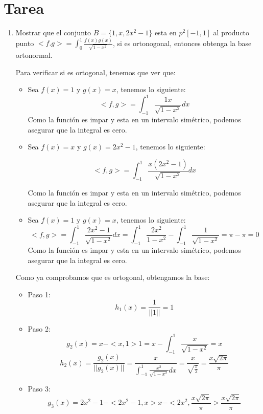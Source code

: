 \documentclass{report}
\begin{document}

    \section*{Tarea}
    \begin{enumerate}
        \item Mostrar que el conjunto $B=\{1,x,2x^2-1\}$ esta en $p^2[-1,1]$ al producto punto $<f.g>=\int_0^1\frac{f(x)g(x)}{\sqrt{1-x^2}}$, si es ortonogonal, entonces obtenga la base ortonormal.
    
        Para verificar si es ortogonal, tenemos que ver que:
    
        \begin{itemize}
            \item     Sea $f(x)=1$ y $g(x)=x$, tenemos lo siguiente:
            $$<f,g>=\int_{-1}^1\frac{1x}{\sqrt{1-x^2}}dx$$ Como la función es impar y esta en un intervalo simétrico, podemos asegurar que la integral es cero.
            \item  Sea $f(x)=x$ y $g(x)=2x^2-1$, tenemos lo siguiente:
    
            $$<f,g>=\int_{-1}^1\frac{x(2x^2-1)}{\sqrt{1-x^2}}dx$$
    
            Como la función es impar y esta en un intervalo simétrico, podemos asegurar que la integral es cero.
            \item     Sea $f(x)=1$ y $g(x)=x$, tenemos lo siguiente:
            $$<f,g>=\int_{-1}^1\frac{2x^2-1}{\sqrt{1-x^2}}dx=\int_{-1}^1\frac{2x^2}{1-x^2}-\int_{-1}^1\frac{1}{\sqrt{1-x^2}}=\pi-\pi=0$$ Como la función es impar y esta en un intervalo simétrico, podemos asegurar que la integral es cero.
    
        \end{itemize}
           
    
        Como ya comprobamos que es ortogonal, obtengamos la base:
    
        \begin{itemize}
            \item Paso 1: $$h_1(x)=\frac{1}{||1||}=1$$
            \item Paso 2: $$g_2(x)=x-<x,1>1=x-\int_{-1}^1\frac{x}{\sqrt{1-x^2}}=x$$ $$h_2(x)=\frac{g_2(x)}{||g_2(x)||}=\frac{x}{\int_{-1}^1\frac{x^2}{\sqrt{1-x^2}}dx}=\frac{x}{\sqrt{\frac{\pi}{2}}}=\frac{x\sqrt{2\pi}}{\pi}$$
            \item Paso 3: $$g_3(x)=2x^2-1-<2x^2-1,x>x-<2x^2,\frac{x\sqrt{2\pi}}{\pi}>\frac{x\sqrt{2\pi}}{\pi}$$
            

\end{itemize}
\end{enumerate}
\end{document}
